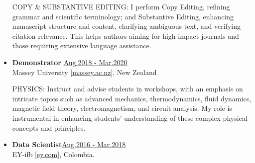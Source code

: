 \begin{itemize}
          {\noindent
              \uppercase{Copy \& Substantive Editing:}
              I perform Copy Editing, refining grammar and scientific terminology; and Substantive Editing, enhancing manuscript structure and content, clarifying ambiguous text, and verifying citation relevance. This helps authors aiming for high-impact journals and those requiring extensive language assistance. %
          }

    \item {\bf Demonstrator} \hfill \href{.}{Aug.2018 - Mar.2020}\\
          Massey University [\href{www.massey.ac.nz}{massey.ac.nz}],
          New Zealand

              {\noindent
                  \uppercase{Physics:}
                  Instruct and advise students in workshops, with an emphasis on intricate topics such as advanced mechanics, thermodynamics, fluid dynamics, magnetic field theory, electromagnetism, and circuit analysis. My role is instrumental in enhancing students' understanding of these complex physical concepts and principles.
              }




    \item {\bf Data Scientist}\hfill \href{.}{Aug.2016 - Mar.2018}\\
          EY-ifb [\href{www.ey.com/en\_gl/ey-ifb}{ey.com}],
          Colombia.


\end{itemize}
